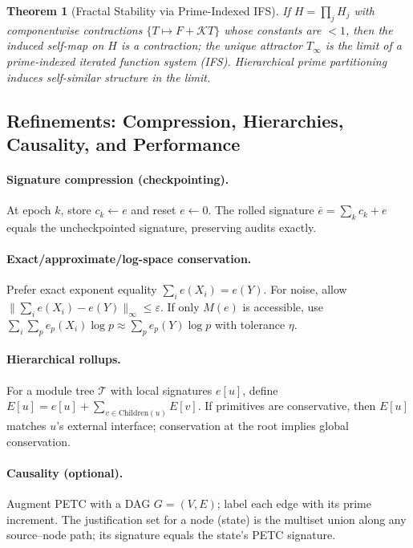 \documentclass[11pt]{article}
\theoremstyle{plain}
\newtheorem{theorem}{Theorem}
\theoremstyle{definition}
\theoremstyle{remark}
\begin{document}
\begin{theorem}[Fractal Stability via Prime-Indexed IFS]
\label{thm:fractal_systems}
If $H=\prod_{j} H_j$ with componentwise contractions $\{T\mapsto F+\mathcal{K}T\}$ whose constants are $<1$, then the induced self-map on $H$ is a contraction; the unique attractor $T_\infty$ is the limit of a prime-indexed iterated function system (IFS). Hierarchical prime partitioning induces self-similar structure in the limit.
\end{theorem}

\subsection{Refinements: Compression, Hierarchies, Causality, and Performance}
\paragraph{Signature compression (checkpointing).}
At epoch $k$, store $c_k\!\gets\!e$ and reset $e\!\gets\!0$. The rolled signature $\overline{e}=\sum_{k} c_k + e$ equals the uncheckpointed signature, preserving audits exactly.

\paragraph{Exact/approximate/log-space conservation.}
Prefer exact exponent equality $\sum_i e(X_i)=e(Y)$. For noise, allow $\|\sum_i e(X_i)-e(Y)\|_\infty\le\varepsilon$. If only $M(e)$ is accessible, use $\sum_i\sum_p e_p(X_i)\log p \approx \sum_p e_p(Y)\log p$ with tolerance $\eta$.

\paragraph{Hierarchical rollups.}
For a module tree $\mathcal{T}$ with local signatures $e[u]$, define $E[u]=e[u]+\sum_{v\in\mathrm{Children}(u)}E[v]$. If primitives are conservative, then $E[u]$ matches $u$'s external interface; conservation at the root implies global conservation.

\paragraph{Causality (optional).}
Augment PETC with a DAG $G=(V,E)$; label each edge with its prime increment. The justification set for a node (state) is the multiset union along any source–node path; its signature equals the state’s PETC signature.
\end{document}
